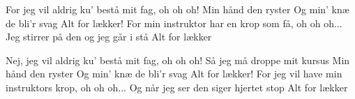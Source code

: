 \documentclass[a4paper,11pt]{article}
\begin{document}
\begin{song}
 For jeg vil aldrig ku' bestå mit fag, oh oh oh!
Min hånd den ryster
Og min' knæ de bli'r svag
 Alt for lækker!
For min instruktor har en krop som få, oh oh
oh...
Jeg stirrer på den og jeg går i stå 
Alt for lækker

 Nej, jeg vil aldrig ku' bestå mit fag, oh oh oh!
 Så jeg må droppe mit kursus
 Min hånd den ryster
Og min' knæ de bli'r svag
 Alt for lækker!
For jeg vil have min instruktors krop, oh oh
oh...
Og når jeg ser den siger hjertet stop
Alt for lækker
\end{song}
\end{document}

